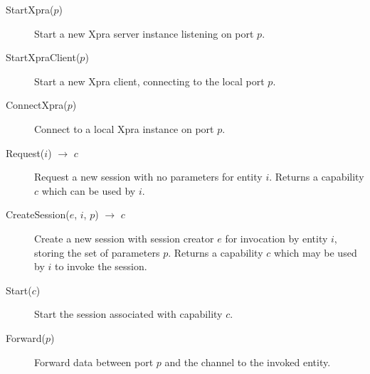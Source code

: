 \begin{description}
    \item[StartXpra($p$)]
        Start a new Xpra server instance listening on port $p$.
    \item[StartXpraClient($p$)]
        Start a new Xpra client, connecting to the local port $p$.
    \item[ConnectXpra($p$)]
        Connect to a local Xpra instance on port $p$.
    \item[Request($i$) $\rightarrow$ $c$]
        Request a new session with no parameters for entity $i$.
        Returns a capability $c$ which can be used by $i$.
    \item[CreateSession($e$, $i$, $p$) $\rightarrow$ $c$]
        Create a new session with session creator $e$ for invocation by entity $i$, storing the set of parameters $p$.
        Returns a capability $c$ which may be used by $i$ to invoke the session.
    \item[Start($c$)]
        Start the session associated with capability $c$.
    \item[Forward($p$)]
        Forward data between port $p$ and the channel to the invoked entity.
\end{description}

